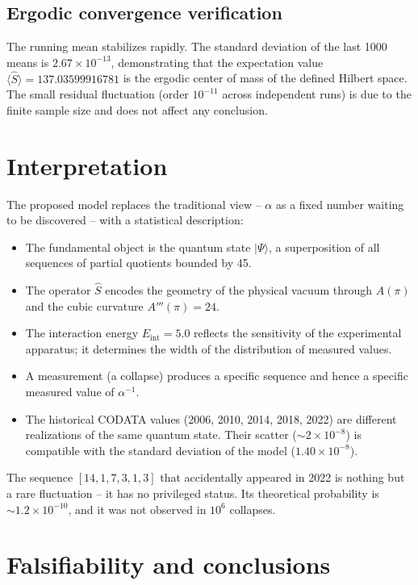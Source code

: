 \documentclass[12pt]{article}
\begin{document}
\subsection{Ergodic convergence verification}

The running mean stabilizes rapidly. The standard deviation of the last 1000 means is $2.67\times10^{-13}$, demonstrating that the expectation value $\langle \hat S \rangle = 137.03599916781$ is the ergodic center of mass of the defined Hilbert space. The small residual fluctuation (order $10^{-11}$ across independent runs) is due to the finite sample size and does not affect any conclusion.

\section{Interpretation}

The proposed model replaces the traditional view – $\alpha$ as a fixed number waiting to be discovered – with a statistical description:

\begin{itemize}
    \item The fundamental object is the quantum state $|\Psi\rangle$, a superposition of all sequences of partial quotients bounded by 45.
    \item The operator $\hat S$ encodes the geometry of the physical vacuum through $A(\pi)$ and the cubic curvature $A'''(\pi)=24$.
    \item The interaction energy $E_{\text{int}}=5.0$ reflects the sensitivity of the experimental apparatus; it determines the width of the distribution of measured values.
    \item A measurement (a collapse) produces a specific sequence and hence a specific measured value of $\alpha^{-1}$.
    \item The historical CODATA values (2006, 2010, 2014, 2018, 2022) are different realizations of the same quantum state. Their scatter ($\sim 2\times10^{-8}$) is compatible with the standard deviation of the model ($1.40\times10^{-8}$).
\end{itemize}

The sequence $[14,1,7,3,1,3]$ that accidentally appeared in 2022 is nothing but a rare fluctuation – it has no privileged status. Its theoretical probability is $\sim 1.2\times10^{-10}$, and it was not observed in $10^6$ collapses.

\section{Falsifiability and conclusions}
\end{document}

